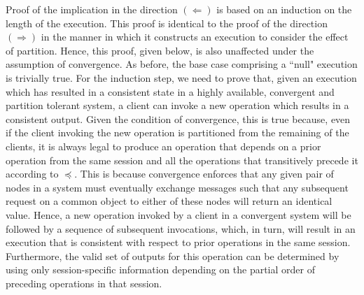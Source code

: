 \documentclass[journal,compsoc]{IEEEtran}
\begin{document}
 \par Proof of the implication in the direction $(\Leftarrow)$ is based on an induction on the length of the execution. This proof is identical to the proof of the direction $(\Rightarrow)$ in the manner in which it constructs an execution to consider the effect of partition. Hence, this proof, given below, is also unaffected under the assumption of convergence.  As before, the base case comprising a ``null" execution is trivially true. For the induction step, we need to prove that, given an execution which has resulted in a consistent state in a highly available, convergent and partition tolerant system, a client can invoke a new operation which results in a consistent output. Given the condition of convergence, this is true because, even if the client invoking the new operation is partitioned from the remaining of the clients, it is always legal to produce an operation that depends on a prior operation from the same session and all the operations that transitively precede it according to $\preccurlyeq$. This is because convergence enforces that any given pair of nodes in a system must eventually exchange messages such that any subsequent request on a common object to either of these nodes will return an identical value. Hence, a new operation invoked by a client in a  convergent system will be followed by a sequence of subsequent invocations, which, in turn, will result in an execution that is consistent with respect to prior operations in the same session. Furthermore, the valid set of outputs for this operation can be determined by using only session-specific information depending on the partial order of preceding operations in that session. 
\end{document}
